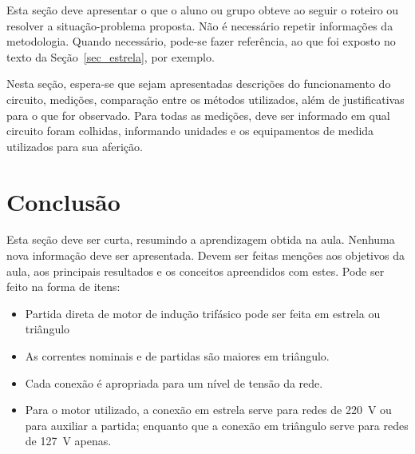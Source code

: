 \documentclass[twocolumn]{article}
\begin{document}
Esta seção deve apresentar o que o aluno ou grupo obteve ao seguir o roteiro ou resolver a situação-problema proposta. Não é necessário repetir informações da metodologia. Quando necessário, pode-se fazer referência, ao que foi exposto no texto da Seção~\ref{sec_estrela}, por exemplo.

Nesta seção, espera-se que sejam apresentadas descrições do funcionamento do circuito, medições, comparação entre os métodos utilizados, além de justificativas para o que for observado. Para todas as medições, deve ser informado em qual circuito foram colhidas, informando unidades e os equipamentos de medida utilizados para sua aferição. 

\section{Conclusão}
Esta seção deve ser curta, resumindo a aprendizagem obtida na aula. Nenhuma nova informação deve ser apresentada. Devem ser feitas menções aos objetivos da aula, aos principais resultados e os conceitos apreendidos com estes. Pode ser feito na forma de itens:

\begin{itemize}
	\item Partida direta de motor de indução trifásico pode ser feita em estrela ou triângulo
	\item As correntes nominais e de partidas são maiores em triângulo.
	\item Cada conexão é apropriada para um nível de tensão da rede.
	\item Para o motor utilizado, a conexão em estrela serve para redes de 220~V ou para auxiliar a partida; enquanto que a conexão em triângulo serve para redes de 127~V apenas.
\end{itemize}




\begin{thebibliography}{refs}
\bibitem{}

\end{thebibliography}
\end{document}
